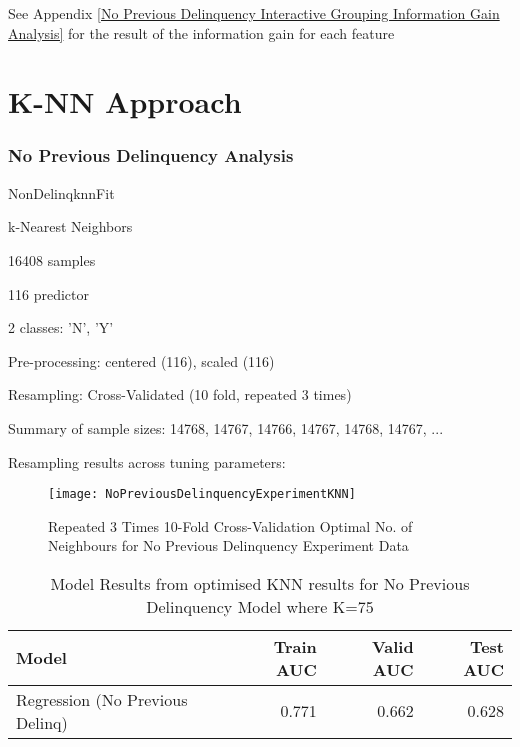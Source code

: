 See Appendix \ref{No Previous Delinquency Interactive Grouping Information Gain Analysis} for the result of the information gain for each feature

\section{K-NN Approach}

\subsubsection{No Previous Delinquency Analysis}

NonDelinqknnFit

k-Nearest Neighbors 


16408 samples

116 predictor

2 classes: 'N', 'Y' 


Pre-processing: centered (116), scaled (116) 

Resampling: Cross-Validated (10 fold, repeated 3 times) 

Summary of sample sizes: 14768, 14767, 14766, 14767, 14768, 14767, ... 

Resampling results across tuning parameters:

\begin{figure}[H]
	\texttt{[image: NoPreviousDelinquencyExperimentKNN]}
	\caption{Repeated 3 Times 10-Fold Cross-Validation Optimal No. of Neighbours for No Previous Delinquency Experiment Data}
	\label{fig:NoPreviousDelinquencyExperimentKNN}
\end{figure}


\begin{table}[H]
	\centering
	\begin{tabular}{l | r | r| r}
		\hline
		\textbf{Model} & \textbf{Train AUC} & \textbf{Valid AUC} &  \textbf{Test AUC} \\
		\hline
		Regression (No Previous Delinq) & 0.771 & 0.662 & 0.628  \\
		\hline
	\end{tabular}
	\caption{Model Results from optimised KNN results for No Previous Delinquency Model where K=75}
	\label{table:knnNoPrevDelinqModel}
\end{table}

